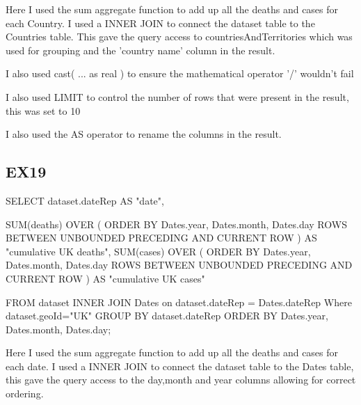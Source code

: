 \documentclass{report}
\begin{document}
	Here I used the sum aggregate function to add up all the deaths and cases for each Country. I used a INNER JOIN to connect the dataset table to the Countries table. This gave the query access to countriesAndTerritories which was used for grouping and the 'country name' column in the result. \newline
	
	I also used cast( ... as real ) to ensure the mathematical operator '/' wouldn't fail\newline
	
	I also used LIMIT to control the number of rows that were present in the result, this was set to 10\newline
	
	I also used the AS operator to rename the columns in the result.
	
	
	\subsection{EX19}
	SELECT dataset.dateRep AS "date", \newline
	
	SUM(deaths) OVER (\newline
	ORDER BY Dates.year, Dates.month, Dates.day\newline
	ROWS BETWEEN\newline
	UNBOUNDED PRECEDING\newline
	AND CURRENT ROW\newline
	) AS "cumulative UK deaths",\newline
	\newline
	SUM(cases) OVER (\newline
	ORDER BY Dates.year, Dates.month, Dates.day\newline
	ROWS BETWEEN\newline
	UNBOUNDED PRECEDING\newline
	AND CURRENT ROW\newline
	) AS "cumulative UK cases"\newline
	
	FROM dataset \newline
	INNER JOIN Dates on dataset.dateRep = Dates.dateRep\newline
	Where dataset.geoId="UK"\newline
	GROUP BY dataset.dateRep \newline
	ORDER BY Dates.year, Dates.month, Dates.day; \newline
	
	Here I used the sum aggregate function to add up all the deaths and cases for each date. I used a INNER JOIN to connect the dataset table to the Dates table, this gave the query access to the day,month and year columns allowing for correct ordering. \newline
	
\end{document}
